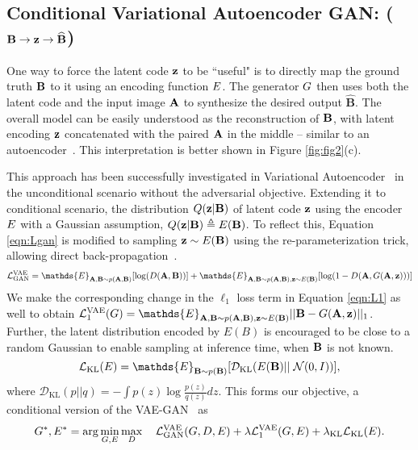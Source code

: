 \subsection{Conditional Variational Autoencoder GAN: \cvaegan ($\mathbf{B} \rightarrow \mathbf{z} \rightarrow \widehat{\mathbf{B}}$)}
One way to force the latent code $\mathbf{z}$ to be ``useful" is to directly map the ground truth $\mathbf{B}$ to it using an encoding function $E$.
The generator $G$ then uses both the latent code and the input image $\mathbf{A}$ to synthesize the desired output $\widehat{\mathbf{B}}$.
The overall model can be easily understood as the reconstruction of $\mathbf{B}$, with latent encoding $\mathbf{z}$ concatenated with the paired $\mathbf{A}$ in the middle -- similar to an autoencoder~\citep{hinton2006reducing}. This interpretation is better shown in Figure \ref{fig:fig2}(c).

This approach has been successfully investigated in Variational Autoencoder~\citep{kingma2013auto} in the unconditional scenario without the adversarial objective. Extending it to conditional scenario, the distribution $Q(\mathbf{z}|\mathbf{B})$ of latent code $\mathbf{z}$ using the encoder $E$ with a Gaussian assumption, $Q(\mathbf{z}|\mathbf{B})\triangleq E(\mathbf{B})$. To reflect this, Equation \ref{eqn:Lgan} is modified to sampling $\mathbf{z}\sim E(\mathbf{B})$ using the re-parameterization trick, allowing direct back-propagation~\citep{kingma2013auto}. 
\begin{equation}
\mathcal{L}_{\text{GAN}}^{\text{VAE}} = \mathds{E}_{\A,\B\sim p(\A,\B)}[\log(\D(\A,\B))] + \mathds{E}_{\A,\B\sim p(\A,\B),\z\sim E(\B)}[ \log(1-\D(\A,\G(\A,\z)))]
\label{eqn:LVAE}
\end{equation}
We make the corresponding change in the $\ell_1$ loss term in Equation \ref{eqn:L1} as well to obtain $\mathcal{L}_1^{\text{VAE}}(\G)=\mathds{E}_{\A,\B\sim p(\A,\B),\z\sim \E(\B)} ||\B - \G(\A,\z) ||_1$. Further, the latent distribution encoded by $E(B)$ is encouraged to be close to a random Gaussian to enable sampling at inference time, when $\mathbf{B}$ is not known.
\begin{equation}
\mathcal{L}_{\text{KL}}(\E) = \mathds{E}_{\B\sim p(\B)} [ \mathcal{D}_{\text{KL}}(\E(\B) || \;\mathcal{N}(0,I)) ],
\label{eqn:KL}
\end{equation}
where $\mathcal{D}_{\text{KL}}(p||q)=-\int  p(z) \log\frac{p(z)}{q(z)}dz $. This forms our \cvaegan objective, a conditional version of the VAE-GAN~\citep{larsen2016vaegan} as
\begin{equation}
G^{*}, E^{*} = \arg\min_{G,E} \max_{D}  \quad \mathcal{L}_{\text{GAN}}^{\text{VAE}}(G,D,E)
+ \lambda\mathcal{L}_1^{\text{VAE}}(G, E)+\lambda_{\text{KL}}\mathcal{L}_{\text{KL}}(E).
\end{equation}

